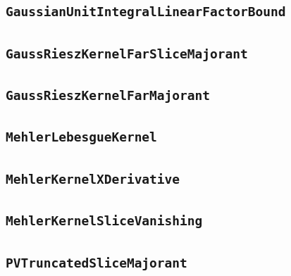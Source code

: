 \documentclass[11pt]{amsart}
\theoremstyle{definition}
\begin{document}
\subsection{\texorpdfstring{\texttt{GaussianUnitIntegralLinearFactorBound}}{GaussianUnitIntegralLinearFactorBound}}\label{node:GaussianUnitIntegralLinearFactorBound}


\subsection{\texorpdfstring{\texttt{GaussRieszKernelFarSliceMajorant}}{GaussRieszKernelFarSliceMajorant}}\label{node:GaussRieszKernelFarSliceMajorant}


\subsection{\texorpdfstring{\texttt{GaussRieszKernelFarMajorant}}{GaussRieszKernelFarMajorant}}\label{node:GaussRieszKernelFarMajorant}


\subsection{\texorpdfstring{\texttt{MehlerLebesgueKernel}}{MehlerLebesgueKernel}}\label{node:MehlerLebesgueKernel}


\subsection{\texorpdfstring{\texttt{MehlerKernelXDerivative}}{MehlerKernelXDerivative}}\label{node:MehlerKernelXDerivative}


\subsection{\texorpdfstring{\texttt{MehlerKernelSliceVanishing}}{MehlerKernelSliceVanishing}}\label{node:MehlerKernelSliceVanishing}


\subsection{\texorpdfstring{\texttt{PVTruncatedSliceMajorant}}{PVTruncatedSliceMajorant}}\label{node:PVTruncatedSliceMajorant}

\end{document}
